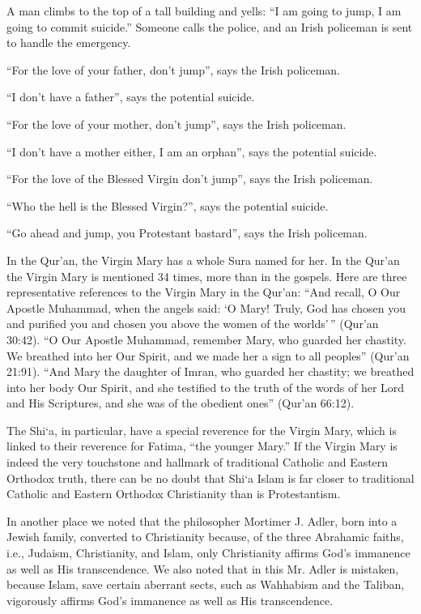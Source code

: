 \begin{quotex}
A man climbs to the top of a tall building and yells: ``I am going to jump, I am going to commit suicide.'' Someone calls the police, and an Irish policeman is sent to handle the emergency.

``For the love of your father, don't jump'', says the Irish policeman.

``I don't have a father'', says the potential suicide.

``For the love of your mother, don't jump'', says the Irish policeman.

``I don't have a mother either, I am an orphan'', says the potential suicide.

``For the love of the Blessed Virgin don't jump'', says the Irish policeman.

``Who the hell is the Blessed Virgin?'', says the potential suicide.

``Go ahead and jump, you Protestant bastard'', says the Irish policeman.
\end{quotex}


In the Qur'an, the Virgin Mary has a whole Sura named for her. In the Qur'an the Virgin Mary is mentioned 34 times, more than in the gospels. Here are three representative references to the Virgin Mary in the Qur'an: ``And recall, O Our Apostle Muhammad, when the angels said: `O Mary! Truly, God has chosen you and purified you and chosen you above the women of the worlds'\,'' (Qur'an 30:42). ``O Our Apostle Muhammad, remember Mary, who guarded her chastity. We breathed into her Our Spirit, and we made her a sign to all peoples'' (Qur'an 21:91). ``And Mary the daughter of Imran, who guarded her chastity; we breathed into her body Our Spirit, and she testified to the truth of the words of her Lord and His Scriptures, and she was of the obedient ones'' (Qur'an 66:12).

The Shi`a, in particular, have a special reverence for the Virgin Mary, which is linked to their reverence for Fatima, ``the younger Mary.'' If the Virgin Mary is indeed the very touchstone and hallmark of traditional Catholic and Eastern Orthodox truth, there can be no doubt that Shi`a Islam is far closer to traditional Catholic and Eastern Orthodox Christianity than is Protestantism.

In another place we noted that the philosopher Mortimer J. Adler, born into a Jewish family, converted to Christianity because, of the three Abrahamic faiths, i.e., Judaism, Christianity, and Islam, only Christianity affirms God's immanence as well as His transcendence. We also noted that in this Mr. Adler is mistaken, because Islam, save certain aberrant sects, such as Wahhabism and the Taliban, vigorously affirms God's immanence as well as His transcendence.

